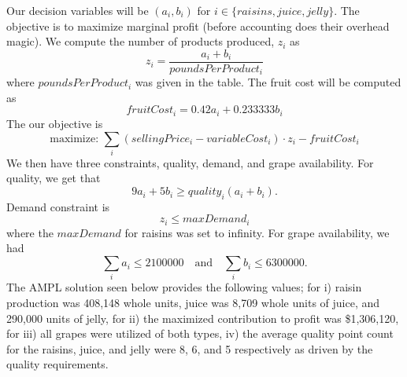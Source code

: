 \documentclass[11pt]{article}
\begin{document}
\begin{enumerate}
\begin{enumerate}
Our decision variables will be $(a_i,b_i)$ for $i\in\{raisins, juice, jelly\}$.  The objective is to maximize marginal profit (before accounting does their overhead magic).  We compute the number of products produced, $z_i$ as
\[
z_i = \frac{a_i+b_i}{poundsPerProduct_i}
\]
where $poundsPerProduct_i$ was given in the table.  The fruit cost will be computed as 
\[
fruitCost_i = 0.42a_i+0.233333b_i
\]
The our objective is
\[
\text{maximize: }\sum_{i}\left(sellingPrice_i-variableCost_i\right)\cdot z_i - fruitCost_i 
\]
We then have three constraints, quality, demand, and grape availability.  For quality, we get that
\[
9a_i+5b_i \geq quality_i(a_i+b_i).
\]
Demand constraint is
\[
z_i \leq maxDemand_i
\]
where the $maxDemand$ for raisins was set to infinity.  For grape availability, we had
\[
\sum_i a_i \leq 2 100 000\quad\text{and}\quad\sum_ib_i \leq 6 300 000.
\]
The AMPL solution seen below provides the following values; for i) raisin production was 408,148 whole units, juice was 8,709 whole units of juice, and 290,000 units of jelly, for ii) the maximized contribution to profit was \$1,306,120, for iii) all grapes were utilized of both types, iv) the average quality point count for the raisins, juice, and jelly were 8, 6, and 5 respectively as driven by the quality requirements.\label{1c}


\end{enumerate}
\end{enumerate}
\end{document}
